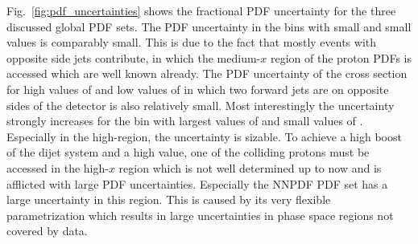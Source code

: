 Fig.~\ref{fig:pdf_uncertainties} shows the fractional PDF uncertainty for the
three discussed global PDF sets. The PDF uncertainty in the bins with small
\ystar and small \yboost values is comparably small. This is due to the fact
that mostly events with opposite side jets contribute, in which the medium-$x$
region of the proton PDFs is accessed which are well known already. The PDF
uncertainty of the cross section for high values of \ystar and low values of
\yboost in which two forward jets are on opposite sides of the detector is also
relatively small. Most interestingly the uncertainty strongly increases for the
bin with largest values of \yboost and small values of \ystar.  Especially in
the high-\pt region, the uncertainty is sizable. To achieve a high boost of the
dijet system and a high \ptavg value, one of the colliding protons must be
accessed in the high-$x$ region which is not well determined up to now and is
afflicted with large PDF uncertainties. Especially the NNPDF PDF set has a large
uncertainty in this region. This is caused by its very flexible parametrization
which results in large uncertainties in phase space regions not covered by data.

